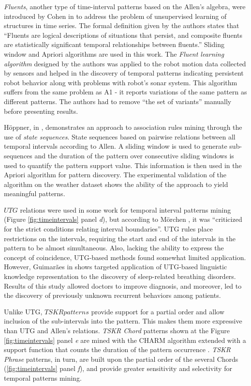\textit{Fluents}, another type of time-interval patterns based on the Allen's algebra, were introduced by Cohen in \cite{citeulike:5153756} to address the problem of unsupervised learning of structures in time series. The formal definition given by the authors states that ``Fluents are logical descriptions of situations that persist, and composite fluents are statistically significant temporal relationships between fluents.'' Sliding window and Apriori algorithms are used in this work. The \textit{Fluent learning algorithm} designed by the authors was applied to the robot motion data collected by sensors and helped in the discovery of temporal patterns indicating persistent robot behavior along with problems with robot's sonar system. This algorithm suffers from the same problem as A1 - it reports variations of the same pattern as different patterns. The authors had to remove ``the set of variants'' manually before presenting results.

H\"{o}ppner, in \cite{citeulike:5159615}, demonstrates an approach to association rules mining through the use of \textit{state sequences}. State sequences based on pairwise relations between all temporal intervals according to Allen. A sliding window is used to generate sub-sequences and the duration of the pattern over consecutive sliding windows is used to quantify the pattern support value. This information is then used in the Apriori algorithm for pattern discovery. The experimental validation of the algorithm on the weather dataset shows the ability of the approach to yield meaningful patterns.

$UTG$ relations were used in some work for temporal interval patterns mining (Figure \ref{fig:timeintervals} panel \textit{d}), but according to M\"orchen \cite{citeulike:1748833}, it was ``criticized for the strict conditions relating interval boundaries''. UTG rules place restrictions on the intervals, requiring the start and end of the intervals in the pattern to be almost simultaneous. Also, lacking the ability to express the concept of coincidence, UTG-based methods found somewhat limited application. However, Guimar\~{a}es in \cite{citeulike:5159924} shows targeted application of UTG-based linguistic knowledge representation to the discovery of sleep-related breathing disorders. Results of this study  allowed doctors to improve diagnosis, and moreover, led to the discovery of previously unknown recurrent behaviors among patients.

Unlike UTG, $TSKR patterns$ provide support for a partial order and allow inclusion of the sub-intervals into the pattern. This makes them more expressive than UTG and Allen's relations. \textit{TSKR Chord} patterns shown at the Figure \ref{fig:timeintervals} panel \textit{e} are mined with the CHARM \cite{citeulike:769773} algorithm extended with a support function that counts the duration of the pattern occurrence \cite{citeulike:1748833}. \textit{TSKR Phrase} patterns, in turn, are built upon the partial order of the several Chords (\ref{fig:timeintervals} panel \textit{f}), and provide greater sensitivity and selectivity for temporal patterns mining.
